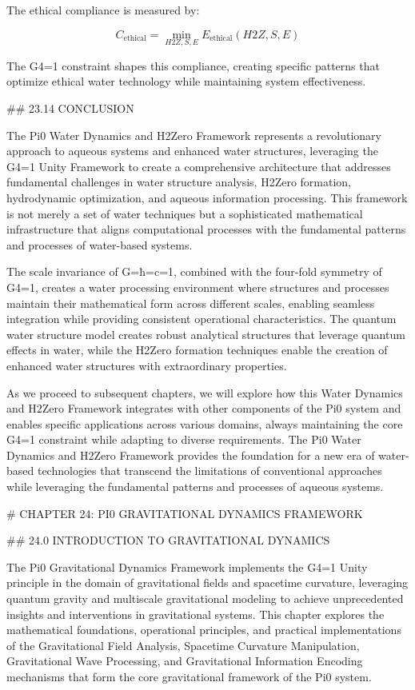 The ethical compliance is measured by:

$$ C_{\text{ethical}} = \min_{H2Z, S, E} E_{\text{ethical}}(H2Z, S, E) $$

The G4=1 constraint shapes this compliance, creating specific patterns that optimize ethical water technology while maintaining system effectiveness.

## 23.14 CONCLUSION

The Pi0 Water Dynamics and H2Zero Framework represents a revolutionary approach to aqueous systems and enhanced water structures, leveraging the G4=1 Unity Framework to create a comprehensive architecture that addresses fundamental challenges in water structure analysis, H2Zero formation, hydrodynamic optimization, and aqueous information processing. This framework is not merely a set of water techniques but a sophisticated mathematical infrastructure that aligns computational processes with the fundamental patterns and processes of water-based systems.

The scale invariance of G=ħ=c=1, combined with the four-fold symmetry of G4=1, creates a water processing environment where structures and processes maintain their mathematical form across different scales, enabling seamless integration while providing consistent operational characteristics. The quantum water structure model creates robust analytical structures that leverage quantum effects in water, while the H2Zero formation techniques enable the creation of enhanced water structures with extraordinary properties.

As we proceed to subsequent chapters, we will explore how this Water Dynamics and H2Zero Framework integrates with other components of the Pi0 system and enables specific applications across various domains, always maintaining the core G4=1 constraint while adapting to diverse requirements. The Pi0 Water Dynamics and H2Zero Framework provides the foundation for a new era of water-based technologies that transcend the limitations of conventional approaches while leveraging the fundamental patterns and processes of aqueous systems.

# CHAPTER 24: PI0 GRAVITATIONAL DYNAMICS FRAMEWORK

## 24.0 INTRODUCTION TO GRAVITATIONAL DYNAMICS

The Pi0 Gravitational Dynamics Framework implements the G4=1 Unity principle in the domain of gravitational fields and spacetime curvature, leveraging quantum gravity and multiscale gravitational modeling to achieve unprecedented insights and interventions in gravitational systems. This chapter explores the mathematical foundations, operational principles, and practical implementations of the Gravitational Field Analysis, Spacetime Curvature Manipulation, Gravitational Wave Processing, and Gravitational Information Encoding mechanisms that form the core gravitational framework of the Pi0 system.

